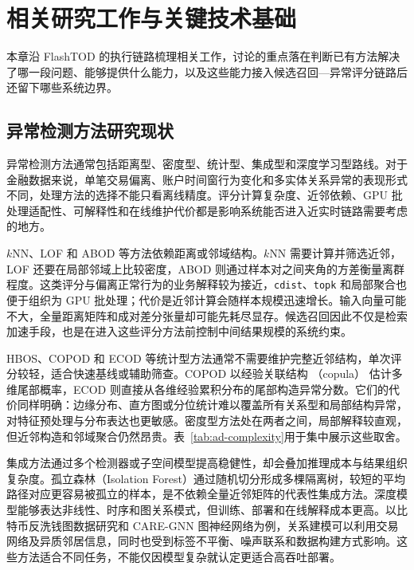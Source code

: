 
\chapter{相关研究工作与关键技术基础}

本章沿 FlashTOD 的执行链路梳理相关工作，讨论的重点落在判断已有方法解决了哪一段问题、能够提供什么能力，以及这些能力接入候选召回---异常评分链路后还留下哪些系统边界。

\section{异常检测方法研究现状}

异常检测方法通常包括距离型、密度型、统计型、集成型和深度学习型路线\citep{chandola2009survey,markou2003novelty,aggarwal2017outlier}。对于金融数据来说，单笔交易偏离、账户时间窗行为变化和多实体关系异常的表现形式不同，处理方法的选择不能只看离线精度。评分计算复杂度、近邻依赖、GPU 批处理适配性、可解释性和在线维护代价都是影响系统能否进入近实时链路需要考虑的地方\citep{phua2010fraudsurvey,akoglu2015graph,song2024financialriskstgnn}。

$k$NN、LOF 和 ABOD 等方法依赖距离或邻域结构。$k$NN 需要计算并筛选近邻，LOF 还要在局部邻域上比较密度，ABOD 则通过样本对之间夹角的方差衡量离群程度\citep{breunig2000lof,angiulli2002fast,kriegel2008abod}。这类评分与偏离正常行为的业务解释较为接近，\texttt{cdist}、\texttt{topk} 和局部聚合也便于组织为 GPU 批处理；代价是近邻计算会随样本规模迅速增长\citep{zhao2022tod}。输入向量可能不大，全量距离矩阵和成对差分张量却可能先耗尽显存。候选召回因此不仅是检索加速手段，也是在进入这些评分方法前控制中间结果规模的系统约束。

HBOS、COPOD 和 ECOD 等统计型方法通常不需要维护完整近邻结构，单次评分较轻，适合快速基线或辅助筛查。COPOD 以经验关联结构 （copula） 估计多维尾部概率，ECOD 则直接从各维经验累积分布的尾部构造异常分数\citep{li2020copod,li2023ecod}。它们的代价同样明确：边缘分布、直方图或分位统计难以覆盖所有关系型和局部结构异常，对特征预处理与分布表达也更敏感。密度型方法处在两者之间，局部解释较直观，但近邻构造和邻域聚合仍然昂贵。表~\ref{tab:ad-complexity}用于集中展示这些取舍。

集成方法通过多个检测器或子空间模型提高稳健性，却会叠加推理成本与结果组织复杂度。孤立森林（Isolation Forest）通过随机切分形成多棵隔离树，较短的平均路径对应更容易被孤立的样本，是不依赖全量近邻矩阵的代表性集成方法\citep{liu2008isolationforest}。深度模型能够表达非线性、时序和图关系模式，但训练、部署和在线解释成本更高。以比特币反洗钱图数据研究和 CARE-GNN 图神经网络为例，关系建模可以利用交易网络及异质邻居信息，同时也受到标签不平衡、噪声联系和数据构建方式影响\citep{weber2019bitcoinaml,dou2020caregnn,chen2021graphanomaly,li2023gnnfraud,yu2024rwkgnn}。这些方法适合不同任务，不能仅因模型复杂就认定更适合高吞吐部署。

